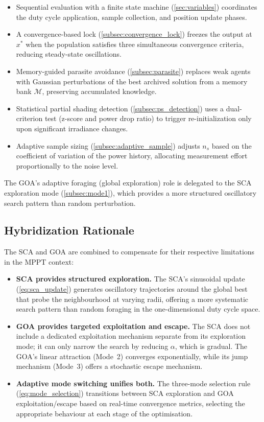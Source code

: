 \documentclass[a4paper, 12pt]{article}
\begin{document}
\begin{itemize}
    \item Sequential evaluation with a finite state machine (\cref{sec:variables}) coordinates the duty cycle application, sample collection, and position update phases.
    \item A convergence-based lock (\cref{subsec:convergence_lock}) freezes the output at $x^{*}$ when the population satisfies three simultaneous convergence criteria, reducing steady-state oscillations.
    \item Memory-guided parasite avoidance (\cref{subsec:parasite}) replaces weak agents with Gaussian perturbations of the best archived solution from a memory bank $\mathcal{M}$, preserving accumulated knowledge.
    \item Statistical partial shading detection (\cref{subsec:ps_detection}) uses a dual-criterion test (z-score and power drop ratio) to trigger re-initialization only upon significant irradiance changes.
    \item Adaptive sample sizing (\cref{subsec:adaptive_sample}) adjusts $n_s$ based on the coefficient of variation of the power history, allocating measurement effort proportionally to the noise level.
\end{itemize}

The GOA's adaptive foraging (global exploration) role is delegated to the SCA exploration mode (\cref{subsec:mode1}), which provides a more structured oscillatory search pattern than random perturbation.


\subsection{Hybridization Rationale}
\label{subsec:hybrid_rationale}

The SCA and GOA are combined to compensate for their respective limitations in the MPPT context:

\begin{itemize}
    \item \textbf{SCA provides structured exploration.} The SCA's sinusoidal update (\cref{eq:sca_update}) generates oscillatory trajectories around the global best that probe the neighbourhood at varying radii, offering a more systematic search pattern than random foraging in the one-dimensional duty cycle space.

    \item \textbf{GOA provides targeted exploitation and escape.} The SCA does not include a dedicated exploitation mechanism separate from its exploration mode; it can only narrow the search by reducing $\alpha$, which is gradual. The GOA's linear attraction (Mode~2) converges exponentially, while its jump mechanism (Mode~3) offers a stochastic escape mechanism.

    \item \textbf{Adaptive mode switching unifies both.} The three-mode selection rule (\cref{eq:mode_selection}) transitions between SCA exploration and GOA exploitation/escape based on real-time convergence metrics, selecting the appropriate behaviour at each stage of the optimisation.
\end{itemize}
\end{document}
